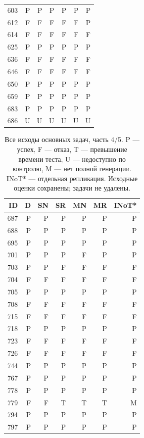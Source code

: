\begin{table}[!htbp]
\begin{tabular*}{\textwidth}{@{\extracolsep{\fill}}rrrrrrr}
603 & P & P & P & P & P & P\\
612 & F & F & F & F & F & P\\
614 & F & F & F & F & F & F\\
625 & P & P & P & P & P & P\\
636 & F & F & F & F & F & F\\
646 & F & F & F & F & F & F\\
650 & P & P & P & P & P & P\\
659 & P & P & P & P & P & P\\
683 & P & P & P & P & P & P\\
686 & U & U & U & U & U & U\\
\bottomrule\end{tabular*}\end{table}
\clearpage
\begin{table}[!htbp]\centering\footnotesize
\caption{Все исходы основных задач, часть 4/5. P --- успех, F --- отказ, T --- превышение времени теста, U --- недоступно по контролю, M --- нет полной генерации. INoT* --- отдельная репликация. Исходные оценки сохранены; задачи не удалены.}
\begin{tabular*}{\textwidth}{@{\extracolsep{\fill}}rrrrrrr}\toprule
ID & D & SN & SR & MN & MR & INoT*\\\midrule
687 & P & P & P & P & P & P\\
688 & P & P & P & P & P & P\\
695 & P & P & P & P & P & P\\
701 & P & P & P & F & P & P\\
703 & P & P & F & F & F & F\\
704 & F & F & F & F & F & F\\
705 & P & P & P & P & P & P\\
708 & F & F & F & F & F & F\\
715 & F & F & F & F & F & F\\
718 & P & P & P & P & P & P\\
723 & F & F & F & F & F & F\\
726 & F & F & F & F & F & F\\
744 & P & P & P & P & P & P\\
767 & P & P & P & P & P & P\\
778 & P & P & P & P & P & P\\
779 & F & F & T & T & T & M\\
794 & P & P & P & P & P & P\\
797 & P & P & P & P & P & P\\

\end{tabular*}
\end{table}
